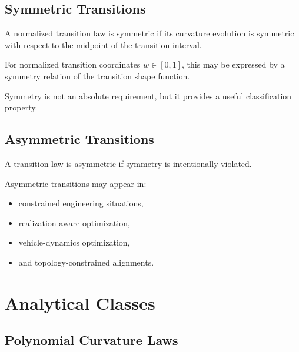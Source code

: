 
\subsection{Symmetric Transitions}

\begin{definition}
\label{def:symmetric-transition}
A normalized transition law is symmetric if its curvature evolution is
symmetric with respect to the midpoint of the transition interval.
\end{definition}

For normalized transition coordinates \(w\in[0,1]\), this may be
expressed by a symmetry relation of the transition shape function.

Symmetry is not an absolute requirement, but it provides a useful
classification property.


\subsection{Asymmetric Transitions}

\begin{definition}
\label{def:asymmetric-transition}
A transition law is asymmetric if symmetry is intentionally violated.
\end{definition}

Asymmetric transitions may appear in:
\begin{itemize}
\item constrained engineering situations,
\item realization-aware optimization,
\item vehicle-dynamics optimization,
\item and topology-constrained alignments.
\end{itemize}

\section{Analytical Classes}

\subsection{Polynomial Curvature Laws}

